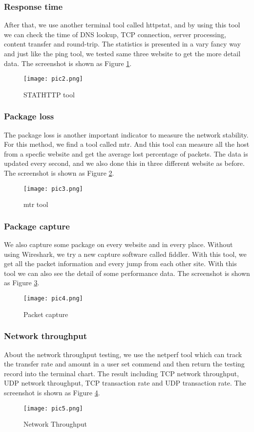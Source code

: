\documentclass[paper=a4, fontsize=11pt]{scrartcl}
\numberwithin{equation}{section}
\numberwithin{figure}{section}
\numberwithin{table}{section}
\begin{document}
\subsubsection{Response time}
After that, we use another terminal tool called httpstat, and by using this tool we can check the time of DNS lookup, TCP connection, server processing, content transfer and round-trip. The statistics is presented in a vary fancy way and just like the ping tool, we tested same three website to get the more detail data. The screenshot is shown as Figure \ref{fig2}.
\begin{figure}[!htb]
\centering
\texttt{[image: pic2.png]}
\caption{STATHTTP tool}
\label{fig2}
\end{figure}
\subsubsection{Package loss}
The package loss is another important indicator to measure the network stability. For this method, we find a tool called mtr. And this tool can measure all the host from a specfic website and get the average lost percentage of packets. The data is updated every second, and we also done this in three different website as before. The screenshot is shown as Figure \ref{fig3}.
\begin{figure}[!htb]
\centering
\texttt{[image: pic3.png]}
\caption{mtr tool}
\label{fig3}
\end{figure}
\subsubsection{Package capture}
We also capture some package on every website and in every place. Without using Wireshark, we try a new capture software called fiddler. With this tool, we get all the packet information and every jump from each other site. With this tool we can also see the detail of some performance data. The screenshot is shown as Figure \ref{fig4}.
\begin{figure}[!htb]
\centering
\texttt{[image: pic4.png]}
\caption{Packet capture}
\label{fig4}
\end{figure}
\subsubsection{Network throughput}
About the network throughput testing, we use the netperf tool which can track the transfer rate and amount in a user set commend and then return the testing record into the terminal chart. The result including TCP network throughput, UDP network throughput, TCP transaction rate and UDP transaction rate. The screenshot is shown as Figure \ref{fig5}.
\begin{figure}[!htb]
\centering
\texttt{[image: pic5.png]}
\caption{Network Throughput}
\label{fig5}
\end{figure}
\end{document}
